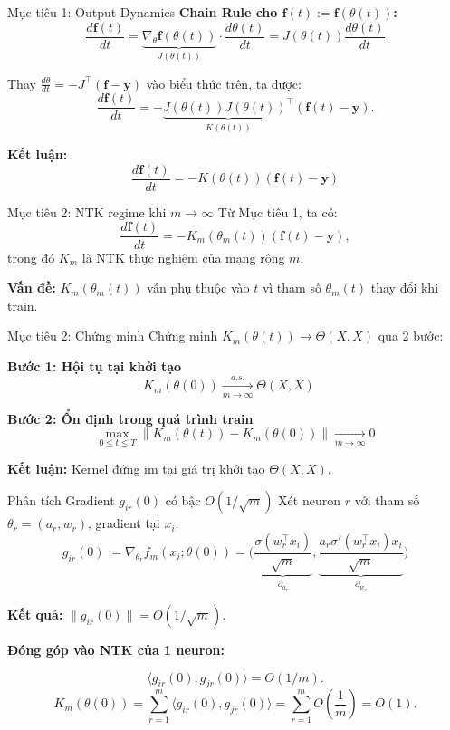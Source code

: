 \begin{frame}{Mục tiêu 1: Output Dynamics}
  \textbf{Chain Rule cho $\mathbf{f}(t) := \mathbf{f}(\theta(t))$:}
  \[
    \frac{d\mathbf{f}(t)}{dt}
    = \underbrace{\nabla_\theta \mathbf{f}(\theta(t))}_{J(\theta(t))} \cdot \frac{d\theta(t)}{dt}
    = J(\theta(t)) \frac{d\theta(t)}{dt}
  \]

  Thay $\displaystyle \frac{d\theta}{dt} = -J^\top (\mathbf{f} - \mathbf{y})$ vào biểu thức trên, ta được:
  \[
    \frac{d\mathbf{f}(t)}{dt} = - \underbrace{J(\theta(t)) J(\theta(t))^\top}_{K(\theta(t))}(\mathbf{f}(t) - \mathbf{y}).
  \]

  \textbf{Kết luận:} 
  \[
    \frac{d\mathbf{f}(t)}{dt} = -K(\theta(t))(\mathbf{f}(t) - \mathbf{y})
  \]
\end{frame}

\begin{frame}{Mục tiêu 2: NTK regime khi $m \to \infty$}
  Từ Mục tiêu 1, ta có:
  \[
    \frac{d\mathbf f(t)}{dt}
    = -K_m(\theta_m(t))(\mathbf f(t) - \mathbf y),
  \]
  trong đó $K_m$ là NTK thực nghiệm của mạng rộng $m$.

  \vspace{0.2cm}
  \textbf{Vấn đề:} $K_m(\theta_m(t))$ vẫn phụ thuộc vào $t$
  vì tham số $\theta_m(t)$ thay đổi khi train.
\end{frame}

\begin{frame}{Mục tiêu 2: Chứng minh}
  Chứng minh $K_m(\theta(t)) \to \Theta(X,X)$ qua 2 bước:

  \vspace{0.3cm}
  \textbf{Bước 1: Hội tụ tại khởi tạo}
  \[
    K_m(\theta(0)) \xrightarrow[m\to\infty]{a.s.} \Theta(X,X) \quad 
  \]

  \vspace{0.3cm}
  \textbf{Bước 2: Ổn định trong quá trình train}
  \[ 
    \max_{0 \le t \le T} \|K_m(\theta(t)) - K_m(\theta(0))\| \xrightarrow[m\to\infty]{} 0
  \]


  \vspace{0.3cm}
  \textbf{Kết luận:} Kernel đứng im tại giá trị khởi tạo $\Theta(X,X)$.
\end{frame}

\begin{frame}{Phân tích Gradient $g_{ir}(0)$ có bậc $O(1/\sqrt{m})$}
  Xét neuron $r$ với tham số $\theta_r = (a_r, w_r)$, gradient tại $x_i$:
  \[
    g_{ir}(0) := \nabla_{\theta_r} f_m(x_i; \theta(0)) = 
    \Big( \underbrace{\frac{\sigma(w_r^\top x_i)}{\sqrt{m}}}_{\partial_{a_r}}, \underbrace{\frac{a_r \sigma'(w_r^\top x_i)x_i}{\sqrt{m}}}_{\partial_{w_r}} \Big)
  \]
  
  \textbf{Kết quả:} $\|g_{ir}(0)\| = O(1/\sqrt{m})$. 

  \vspace{0.3cm}
  \textbf{Đóng góp vào NTK của 1 neuron:}
    
  \[
    \langle g_{ir}(0), g_{jr}(0) \rangle = O(1/m).
   \] 
   \[
    K_m(\theta(0)) = \sum_{r=1}^m \langle g_{ir}(0), g_{jr}(0) \rangle = \sum_{r=1}^m O\left(\frac{1}{m}\right) = O(1).
  \]
\end{frame}

